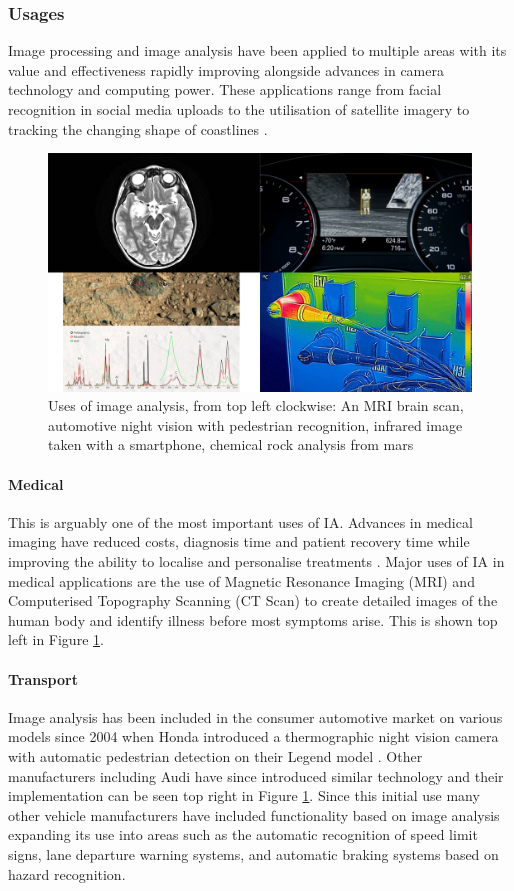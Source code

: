 	\subsubsection{Usages}
		Image processing and image analysis have been applied to multiple areas with its value and effectiveness rapidly improving alongside advances in camera technology and computing power. These applications range from facial recognition in social media uploads \citep{zuckerberg2011tagging} to the utilisation of satellite imagery to tracking the changing shape of coastlines \citep{costalimagery}.
		\begin{figure}[h!]
			\centering
			\includegraphics[width=15cm]{../images/4panel.png}
			\caption[Uses of image analysis]{Uses of image analysis, from top left clockwise: An MRI brain scan, automotive night vision with pedestrian recognition, infrared image taken with a smartphone, chemical rock analysis from mars}
			\label{fig:analysis_uses}
		\end{figure}
		\paragraph{Medical}
			This is arguably one of the most important uses of IA. Advances in medical imaging have reduced costs, diagnosis time and patient recovery time while improving the ability to localise and personalise treatments \citep{esfmedical}. Major uses of IA in medical applications are the use of Magnetic Resonance Imaging (MRI) and Computerised Topography Scanning (CT Scan) to create detailed images of the human body and identify illness before most symptoms arise. This is shown top left in Figure \ref{fig:analysis_uses}.
		\paragraph{Transport}
			Image analysis has been included in the consumer automotive market on various models since 2004 when Honda introduced a thermographic night vision camera with automatic pedestrian detection on their Legend model \citep{hondanightvision}. Other manufacturers including Audi have since introduced similar technology and their implementation can be seen top right in Figure \ref{fig:analysis_uses}. Since this initial use many other vehicle manufacturers have included functionality based on image analysis expanding its use into areas such as the automatic recognition of speed limit signs, lane departure warning systems, and automatic braking systems based on hazard recognition.
